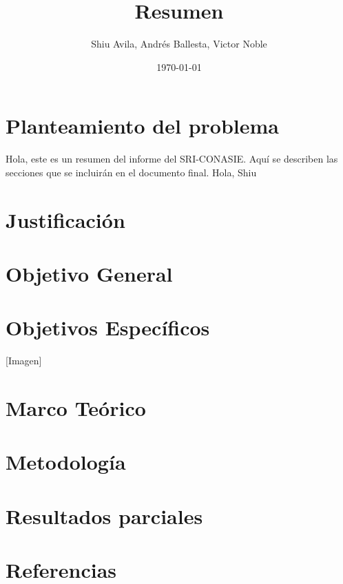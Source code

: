 \documentclass[12pt,a4paper]{article}
\title{Resumen}
\author{Shiu Avila, Andrés Ballesta, Victor Noble}
\date{\today}
\begin{document}
\maketitle

\section{Planteamiento del problema}

Hola, este es un resumen del informe del SRI-CONASIE. Aquí se describen las secciones que se incluirán en el documento final.
Hola, Shiu

\section{Justificación}

\section{Objetivo General}
\section{Objetivos Específicos}

[Imagen]

\section{Marco Teórico}
\section{Metodología}


\section{Resultados parciales}
\section{Referencias}
\end{document}

